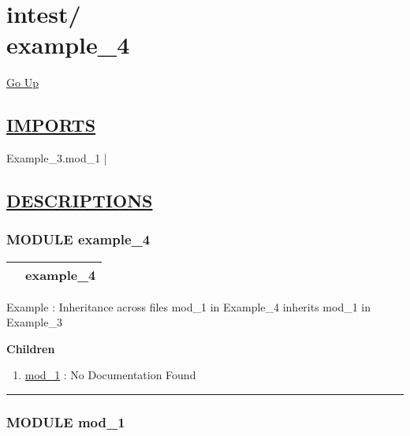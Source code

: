 \chapter*{\color{headfile}
{\large intest\slash\hspace{0pt}}
 \\
example_4
}
\hypertarget{ecldoc:toc:intest.example_4}{}
\hyperlink{ecldoc:toc:root/intest}{Go Up}

\section*{\underline{\textsf{IMPORTS}}}
\begin{doublespace}
{\large
Example\_3.mod\_1 |
}
\end{doublespace}

\section*{\underline{\textsf{DESCRIPTIONS}}}
\subsection*{\textsf{\colorbox{headtoc}{\color{white} MODULE}
example\_4}}

\hypertarget{ecldoc:intest.example_4}{}

{\renewcommand{\arraystretch}{1.5}
\begin{tabularx}{\textwidth}{|>{\raggedright\arraybackslash}l|X|}
\hline
\hspace{0pt}\mytexttt{\color{red} } & \textbf{example\_4} \\
\hline
\end{tabularx}
}

\par





Example : Inheritance across files mod\_1 in Example\_4 inherits mod\_1 in Example\_3







\textbf{Children}
\begin{enumerate}
\item \hyperlink{ecldoc:intest.example_4.mod_1}{mod\_1}
: No Documentation Found
\end{enumerate}

\rule{\linewidth}{0.5pt}

\subsection*{\textsf{\colorbox{headtoc}{\color{white} MODULE}
mod\_1}}

